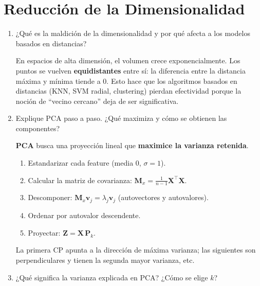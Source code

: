\documentclass[11pt,a4paper]{article}
\begin{document}
\section{Reducci\'on de la Dimensionalidad}

\begin{enumerate}[label=\textbf{P\arabic*.}, resume]

\item ¿Qu\'e es la maldici\'on de la dimensionalidad y por qu\'e afecta a los modelos
  basados en distancias?

\begin{answerbox}
En espacios de alta dimensi\'on, el volumen crece exponencialmente. Los puntos se
vuelven \textbf{equidistantes} entre s\'i: la diferencia entre la distancia m\'axima y
m\'inima tiende a 0. Esto hace que los algoritmos basados en distancias (KNN, SVM radial,
clustering) pierdan efectividad porque la noci\'on de ``vecino cercano'' deja de ser
significativa.
\end{answerbox}

\item Explique PCA paso a paso. ¿Qu\'e maximiza y c\'omo se obtienen las componentes?

\begin{answerbox}
\textbf{PCA} busca una proyecci\'on lineal que \textbf{maximice la varianza retenida}.
\begin{enumerate}[label=\arabic*., topsep=2pt, itemsep=2pt]
  \item Estandarizar cada feature (media 0, $\sigma = 1$).
  \item Calcular la matriz de covarianza: $\mathbf{M}_x = \frac{1}{n-1}\mathbf{X}^\top\mathbf{X}$.
  \item Descomponer: $\mathbf{M}_x \mathbf{v}_j = \lambda_j \mathbf{v}_j$ (autovectores y autovalores).
  \item Ordenar por autovalor descendente.
  \item Proyectar: $\mathbf{Z} = \mathbf{X}\,\mathbf{P}_k$.
\end{enumerate}
La primera CP apunta a la direcci\'on de m\'axima varianza; las siguientes son
perpendiculares y tienen la segunda mayor varianza, etc.
\end{answerbox}

\item ¿Qu\'e significa la varianza explicada en PCA? ¿C\'omo se elige $k$?


\end{enumerate}
\end{document}
